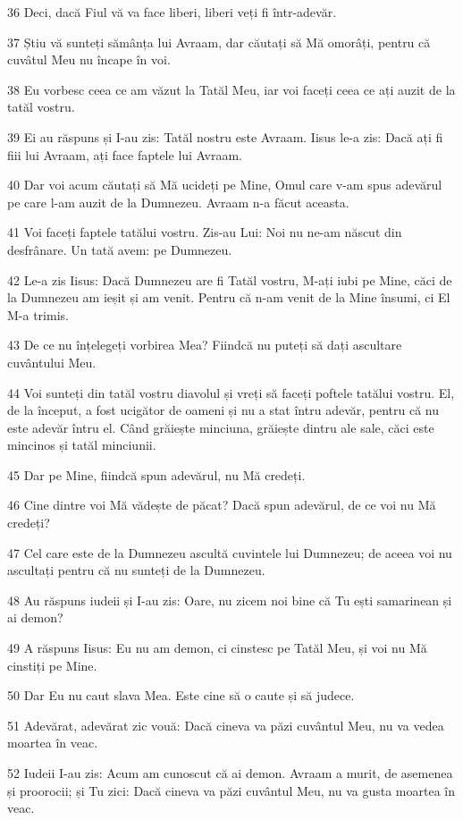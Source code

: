 \par 36 Deci, dacă Fiul vă va face liberi, liberi veți fi într-adevăr.
\par 37 Știu vă sunteți sămânța lui Avraam, dar căutați să Mă omorâți, pentru că cuvâtul Meu nu încape în voi.
\par 38 Eu vorbesc ceea ce am văzut la Tatăl Meu, iar voi faceți ceea ce ați auzit de la tatăl vostru.
\par 39 Ei au răspuns și I-au zis: Tatăl nostru este Avraam. Iisus le-a zis: Dacă ați fi fiii lui Avraam, ați face faptele lui Avraam.
\par 40 Dar voi acum căutați să Mă ucideți pe Mine, Omul care v-am spus adevărul pe care l-am auzit de la Dumnezeu. Avraam n-a făcut aceasta.
\par 41 Voi faceți faptele tatălui vostru. Zis-au Lui: Noi nu ne-am născut din desfrânare. Un tată avem: pe Dumnezeu.
\par 42 Le-a zis Iisus: Dacă Dumnezeu are fi Tatăl vostru, M-ați iubi pe Mine, căci de la Dumnezeu am ieșit și am venit. Pentru că n-am venit de la Mine însumi, ci El M-a trimis.
\par 43 De ce nu înțelegeți vorbirea Mea? Fiindcă nu puteți să dați ascultare cuvântului Meu.
\par 44 Voi sunteți din tatăl vostru diavolul și vreți să faceți poftele tatălui vostru. El, de la început, a fost ucigător de oameni și nu a stat întru adevăr, pentru că nu este adevăr întru el. Când grăiește minciuna, grăiește dintru ale sale, căci este mincinos și tatăl minciunii.
\par 45 Dar pe Mine, fiindcă spun adevărul, nu Mă credeți.
\par 46 Cine dintre voi Mă vădește de păcat? Dacă spun adevărul, de ce voi nu Mă credeți?
\par 47 Cel care este de la Dumnezeu ascultă cuvintele lui Dumnezeu; de aceea voi nu ascultați pentru că nu sunteți de la Dumnezeu.
\par 48 Au răspuns iudeii și I-au zis: Oare, nu zicem noi bine că Tu ești samarinean și ai demon?
\par 49 A răspuns Iisus: Eu nu am demon, ci cinstesc pe Tatăl Meu, și voi nu Mă cinstiți pe Mine.
\par 50 Dar Eu nu caut slava Mea. Este cine să o caute și să judece.
\par 51 Adevărat, adevărat zic vouă: Dacă cineva va păzi cuvântul Meu, nu va vedea moartea în veac.
\par 52 Iudeii I-au zis: Acum am cunoscut că ai demon. Avraam a murit, de asemenea și proorocii; și Tu zici: Dacă cineva va păzi cuvântul Meu, nu va gusta moartea în veac.
